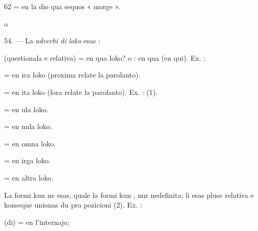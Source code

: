 \begin{VUpage}[66]{62}
 = en la dio qua sequos « morge ».

 o 

\VUblanc{8.90pt}%
54. --- La \textit{adverbi di loko} esas :

\VUblancAlinea
{} (questionala e relativa) = en qua loko? o : en qua\nl
(en qui). Ex. : 

 = en ica loko (proxima relate la parolanto).

 = en ita loko (fora relate la parolanto). Ex. : \nl
{} (1).

 = en ula loko.

 = en nula loko.

 = en omna loko.

 = en irga loko.

 = en altra loko.

La formi kun  ne esas, quale la formi kun , nur\nl
nedefinita; li esas pluse relativa e konseque unionas du pro\cc
pozicioni (2). Ex. : \nl
{}

 (di) = en l'internajo;
\end{VUpage}

